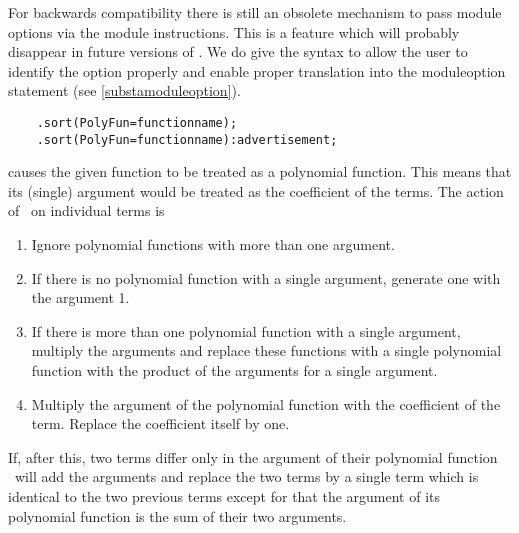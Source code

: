 For backwards compatibility there is still an obsolete 
mechanism to pass module options via the module instructions. This is a 
feature which will probably disappear in future versions of \FORM\@. We do 
give the syntax to allow the user to identify the option properly and 
enable proper translation into the moduleoption 
statement (see \ref{substamoduleoption}).
\begin{verbatim}
    .sort(PolyFun=functionname);
    .sort(PolyFun=functionname):advertisement;
\end{verbatim}
causes the given function to be treated as a polynomial 
function. This means that its (single) argument would be treated as the 
coefficient of the terms. The action of \FORM\ on individual terms is
\begin{enumerate}
\item Ignore polynomial functions with more than one argument.
\item If there is no polynomial function with a single argument, generate 
one with the argument 1.\item If there is more than one polynomial function 
with a single argument, multiply the arguments and replace these functions 
with a single polynomial function with the product of the arguments for a 
single argument.
\item Multiply the argument of the polynomial function with the coefficient 
of the term. Replace the coefficient itself by one.
\end{enumerate}
If, after this, two terms differ only in the argument of their polynomial 
function \FORM\ will add the arguments and replace the two terms by a single 
term which is identical to the two previous terms except for that the 
argument of its polynomial function is the sum of their two arguments.

